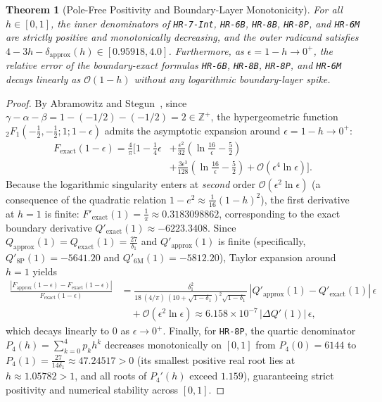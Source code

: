\documentclass[11pt,a4paper]{article}
\theoremstyle{spacious}
\newtheorem{theorem}{Theorem}[section]
\theoremstyle{spaciousdef}
\begin{document}
\begin{theorem}[Pole-Free Positivity and Boundary-Layer Monotonicity]\label{thm:boundary_layer}
For all $h \in [0, 1]$, the inner denominators of \texttt{HR-7-Int}, \texttt{HR-6B}, \texttt{HR-8B}, \texttt{HR-8P}, and \texttt{HR-6M} are strictly positive and monotonically decreasing, and the outer radicand satisfies $4 - 3h - \delta_{\text{approx}}(h) \in [0.95918, 4.0]$. Furthermore, as $\epsilon = 1 - h \to 0^+$, the relative error of the boundary-exact formulas \texttt{HR-6B}, \texttt{HR-8B}, \texttt{HR-8P}, and \texttt{HR-6M} decays linearly as $\mathcal{O}(1 - h)$ without any logarithmic boundary-layer spike.
\end{theorem}

\begin{proof}
By Abramowitz and Stegun~\cite[(15.3.12)]{AbramowitzStegun1964}, since $\gamma - \alpha - \beta = 1 - (-1/2) - (-1/2) = 2 \in \mathbb{Z}^+$, the hypergeometric function ${}_2F_1\!\left(-\tfrac{1}{2}, -\tfrac{1}{2}; 1; 1 - \epsilon\right)$ admits the asymptotic expansion around $\epsilon = 1 - h \to 0^+$:
\begin{equation}\label{eq:as_15_3_12}
\begin{aligned}
F_{\text{exact}}(1 - \epsilon) = \frac{4}{\pi}\Biggl[1 - \frac{1}{4}\epsilon &+ \frac{\epsilon^2}{32}\left(\ln\frac{16}{\epsilon} - \frac{5}{2}\right) \\
&+ \frac{3\epsilon^3}{128}\left(\ln\frac{16}{\epsilon} - \frac{5}{2}\right) + \mathcal{O}(\epsilon^4\ln\epsilon)\Biggr].
\end{aligned}
\end{equation}
Because the logarithmic singularity enters at \emph{second} order $\mathcal{O}(\epsilon^2 \ln\epsilon)$ (a consequence of the quadratic relation $1 - e^2 \approx \tfrac{1}{16}(1-h)^2$), the first derivative at $h = 1$ is finite: $F'_{\text{exact}}(1) = \tfrac{1}{\pi} \approx 0.3183098862$, corresponding to the exact boundary derivative $Q'_{\text{exact}}(1) \approx -6223.3408$. Since $Q_{\text{approx}}(1) = Q_{\text{exact}}(1) = \tfrac{27}{\delta_1}$ and $Q'_{\text{approx}}(1)$ is finite (specifically, $Q'_{\text{8P}}(1) = -5641.20$ and $Q'_{\text{6M}}(1) = -5812.20$), Taylor expansion around $h = 1$ yields
\[
\begin{aligned}
\frac{|F_{\text{approx}}(1-\epsilon) - F_{\text{exact}}(1-\epsilon)|}{F_{\text{exact}}(1-\epsilon)}
&= \frac{\delta_1^2}{18\,(4/\pi)\,(10+\sqrt{1-\delta_1})^2\sqrt{1-\delta_1}}\,|Q'_{\text{approx}}(1) - Q'_{\text{exact}}(1)|\,\epsilon \\
&\quad + \mathcal{O}(\epsilon^2\ln\epsilon) \approx 6.158 \times 10^{-7}\,|\Delta Q'(1)|\,\epsilon,
\end{aligned}
\]
which decays linearly to $0$ as $\epsilon \to 0^+$. Finally, for \texttt{HR-8P}, the quartic denominator $P_4(h) = \sum_{k=0}^4 p_k h^k$ decreases monotonically on $[0, 1]$ from $P_4(0) = 6144$ to $P_4(1) = \tfrac{27}{14\delta_1} \approx 47.24517 > 0$ (its smallest positive real root lies at $h \approx 1.05782 > 1$, and all roots of $P_4'(h)$ exceed $1.159$), guaranteeing strict positivity and numerical stability across $[0, 1]$.
\end{proof}
\end{document}
